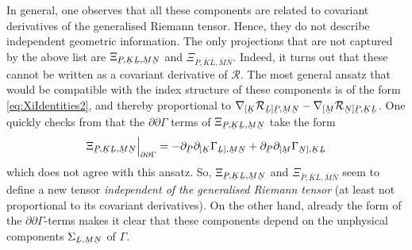 \documentclass[11pt,a4paper]{article}
\numberwithin{equation}{section}
\newcommand{\ubar}[1]{\underaccent{\bar}{#1}}
\newcommand{\bK}{\bar{K}}
\newcommand{\bL}{\bar{L}}
\newcommand{\bM}{\bar{M}}
\newcommand{\bN}{\bar{N}}
\newcommand{\bP}{\bar{P}}
\newcommand{\ubK}{\ubar{K}}
\newcommand{\ubL}{\ubar{L}}
\newcommand{\ubM}{\ubar{M}}
\newcommand{\ubN}{\ubar{N}}
\newcommand{\ubP}{\ubar{P}}
\begin{document}
In general, one observes that all these components are related to covariant derivatives of the generalised Riemann tensor. Hence, they do not describe independent geometric information. The only projections that are not captured by the above list are $\Xi_{\ubP,\ubK\ubL,\ubM\ubN}$ and $\Xi_{\bP,\bK\bL,\bM\bN}$. Indeed, it turns out that these cannot be written as a covariant derivative of $\mathcal{R}$. The most general ansatz that would be compatible with the index structure of these components is of the form \eqref{eq:XiIdentities2}, and thereby proportional to $\nabla_{[\ubK} \mathcal{R}_{\ubL]\ubP,\ubM\ubN} - \nabla_{[\ubM} \mathcal{R}_{\ubN]\ubP,\ubK\ubL}$. One quickly checks from  that the $\partial \partial \Gamma$ terms of $\Xi_{\ubP,\ubK\ubL,\ubM\ubN}$ take the form
\begin{align}
    \Xi_{\ubP,\ubK\ubL,\ubM\ubN} \Big\vert_{\partial \partial \Gamma} = -  \partial_{\ubP} \partial_{[\ubK} \Gamma_{\ubL],\ubM \ubN} + \partial_{\ubP} \partial_{[\ubM} \Gamma_{\ubN],\ubK \ubL}
\end{align}
which does not agree with this ansatz. So, $\Xi_{\ubP,\ubK\ubL,\ubM\ubN}$ and $\Xi_{\bP,\bK\bL,\bM\bN}$ seem to define a new tensor \textit{independent of the generalised Riemann tensor} (at least not proportional to its covariant derivatives). On the other hand, already the form of the $\partial\partial \Gamma$-terms makes it clear that these components depend on the unphysical components $\Sigma_{\ubL,\ubM\ubN}$ of $\Gamma$.
\end{document}
